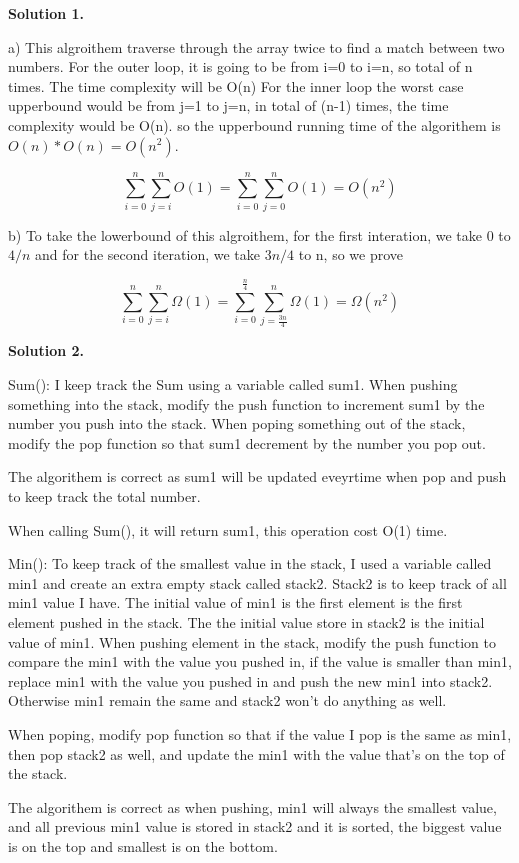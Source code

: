 \documentclass[12pt]{article}
\newcommand{\solution}[1]{\noindent \textbf{Solution #1.}}
\begin{document}
\solution{1} 

a) This algroithem traverse through the array twice to find a match between two numbers.
For the outer loop, it is going to be from i=0 to i=n, so total of n times. The time complexity will be O(n)
For the inner loop the worst case upperbound would be from j=1 to j=n, in total of (n-1) times, the time complexity would be O(n).
so the upperbound running time of the algorithem is $O(n)*O(n)=O(n^2)$. 

\[\sum_{i=0}^n\sum_{j=i}^nO\left(1\right)=\sum_{i=0}^n\sum_{j=0}^nO\left(1\right)=O\left(n^2\right)\]

b) To take the lowerbound of this algroithem, for the first interation, we take 0 to $4/n$ and for the second iteration, 
we take $3n/4$ to n, so we prove

\[\sum_{i=0}^n\sum_{j=i}^n\Omega\left(1\right)=\sum_{i=0}^{\frac{n}{4}}\sum_{j=\frac{3n}{4}}^n\Omega\left(1\right)=\Omega\left(n^2\right)\]

\solution{2} 

Sum(): I keep track the Sum using a variable called sum1. When pushing something into the stack, modify the push function to increment sum1 by the number
you push into the stack. When poping something out of the stack, modify the pop function so that sum1 decrement by the number you pop out. 

The algorithem is correct as sum1 will be updated eveyrtime when pop and push to keep track the total number.

When calling Sum(), it will
return sum1, this operation cost O(1) time.

Min(): To keep track of the smallest value in the stack, I used a variable called min1 and create an extra empty stack called stack2. 
Stack2 is to keep track of all min1 value I have.
The initial value of min1 is the first element is the first element pushed in the stack. The the initial value store in stack2 is the initial value of min1.
When pushing element in the stack,
modify the push function to compare the min1 with the value you pushed in,
if the value is smaller than min1, replace min1 with the value you pushed in and push the new min1 into stack2. Otherwise min1 remain the same and stack2 won't do anything as well.


When poping, modify pop function so that if the value I pop is the same as min1, then pop stack2 as well, and update the min1 with the 
value that's on the top of the stack.

The algorithem is correct as when pushing, min1 will always the smallest value, and all previous min1 value is stored in stack2 and it is sorted, the biggest value is on the top and smallest is on the bottom.
\end{document}
